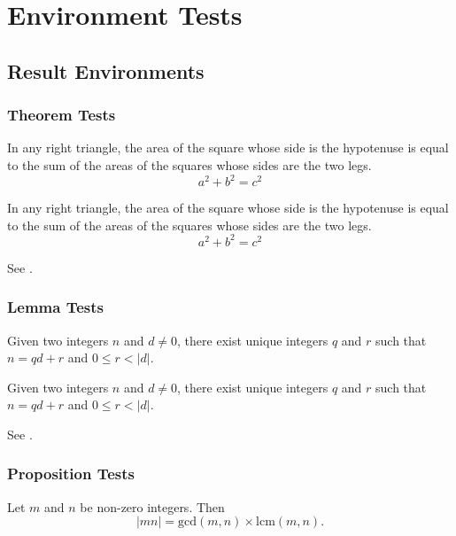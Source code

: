 \chapter*{Environment Tests}
\section*{Result Environments}
\subsection*{Theorem Tests}
\begin{theorem}
    In any right triangle, the area of the square whose side is the hypotenuse is equal to the sum of the areas of the squares whose sides are the two legs.
    \[
        a^2 + b^2 = c^2
    \]
\end{theorem}

\begin{theorem}\label{thrm:test}
    In any right triangle, the area of the square whose side is the hypotenuse is equal to the sum of the areas of the squares whose sides are the two legs.
    \[
        a^2 + b^2 = c^2
    \]
\end{theorem}

See .

\subsection*{Lemma Tests}
\begin{lemma}
    Given two integers $n$ and $d \neq 0$, there exist unique integers $q$ and $r$ such that $n = qd + r$ and $0 \leq r < |d|$.
\end{lemma}

\begin{lemma}[B\'ezout]\label{lemma:test}
    Given two integers $n$ and $d \neq 0$, there exist unique integers $q$ and $r$ such that $n = qd + r$ and $0 \leq r < |d|$.
\end{lemma}

See .

\subsection*{Proposition Tests}
\begin{proposition}
    Let $m$ and $n$ be non-zero integers. Then
    \[
        |mn| = \mathrm{gcd}(m,n) \times \mathrm{lcm}(m,n).
    \]
\end{proposition}

